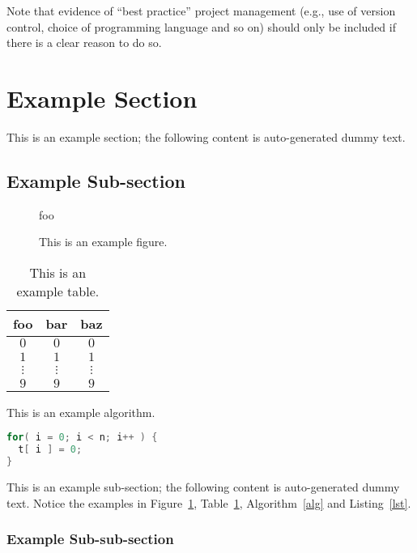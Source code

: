\documentclass[ %
                    author={Luke Murray},
                supervisor={Dr. Simon Hollis},
                     title={Shadow Peer-to-Peer Networks},
                  subtitle={},
                    degree={MEng},
                      year={2013} ]{thesis}
\begin{document}
\noindent
Note that evidence of ``best practice'' project management (e.g., use of 
version control, choice of programming language and  so on) should only 
be included if there is a clear reason to do so.

\section{Example Section}

This is an example section; 
the following content is auto-generated dummy text.
\lipsum

\subsection{Example Sub-section}

\begin{figure}[t]
\centering
foo
\caption{This is an example figure.}
\label{fig}
\end{figure}

\begin{table}[t]
\centering
\begin{tabular}{|cc|c|}
\hline
foo      & bar      & baz      \\
\hline
$0     $ & $0     $ & $0     $ \\
$1     $ & $1     $ & $1     $ \\
$\vdots$ & $\vdots$ & $\vdots$ \\
$9     $ & $9     $ & $9     $ \\
\hline
\end{tabular}
\caption{This is an example table.}
\label{tab}
\end{table}

\begin{algorithm}[t]
\caption{This is an example algorithm.}
\label{alg}
\end{algorithm}

\begin{lstlisting}[float={t},caption={This is an example listing.},label={lst},language=C]
for( i = 0; i < n; i++ ) {
  t[ i ] = 0;
}
\end{lstlisting}

This is an example sub-section;
the following content is auto-generated dummy text.
Notice the examples in Figure~\ref{fig}, Table~\ref{tab}, Algorithm~\ref{alg}
and Listing~\ref{lst}.
\lipsum

\subsubsection{Example Sub-sub-section}
\end{document}
